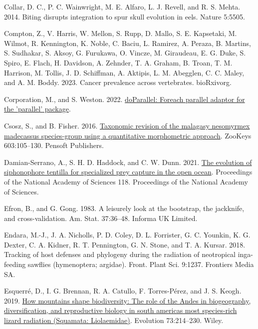 \documentclass[fleqn,10pt,lineno]{wlpeerj} %
\newlength{\cslhangindent}
\newlength{\cslentryspacingunit} %
\newenvironment{CSLReferences}[2] %
 {%
  \setlength{\parindent}{0pt}
  \ifodd #1
  \let\oldpar\par
  \def\par{\hangindent=\cslhangindent\oldpar}
  \fi
  \setlength{\parskip}{#2\cslentryspacingunit}
 }%
 {}
\begin{document}
\begin{CSLReferences}{1}{0}
\leavevmode{}%
Collar, D. C., P. C. Wainwright, M. E. Alfaro, L. J. Revell, and R. S. Mehta. 2014. Biting disrupts integration to spur skull evolution in eels. Nature 5:5505.

\leavevmode{}%
Compton, Z., V. Harris, W. Mellon, S. Rupp, D. Mallo, S. E. Kapsetaki, M. Wilmot, R. Kennington, K. Noble, C. Baciu, L. Ramirez, A. Peraza, B. Martins, S. Sudhakar, S. Aksoy, G. Furukawa, O. Vincze, M. Giraudeau, E. G. Duke, S. Spiro, E. Flach, H. Davidson, A. Zehnder, T. A. Graham, B. Troan, T. M. Harrison, M. Tollis, J. D. Schiffman, A. Aktipis, L. M. Abegglen, C. C. Maley, and A. M. Boddy. 2023. Cancer prevalence across vertebrates. bioRxivorg.

\leavevmode{}%
Corporation, M., and S. Weston. 2022. \href{https://CRAN.R-project.org/package=doParallel}{doParallel: Foreach parallel adaptor for the 'parallel' package}.

\leavevmode{}%
Csosz, S., and B. Fisher. 2016. \href{https://doi.org/10.3897/zookeys.603.8271}{Taxonomic revision of the malagasy nesomyrmex madecassus species-group using a quantitative morphometric approach}. {ZooKeys} 603:105--130. Pensoft Publishers.

\leavevmode{}%
Damian-Serrano, A., S. H. D. Haddock, and C. W. Dunn. 2021. \href{https://doi.org/10.1073/pnas.2005063118}{The evolution of siphonophore tentilla for specialized prey capture in the open ocean}. Proceedings of the National Academy of Sciences 118. Proceedings of the National Academy of Sciences.

\leavevmode{}%
Efron, B., and G. Gong. 1983. A leisurely look at the bootstrap, the jackknife, and cross-validation. Am. Stat. 37:36--48. Informa UK Limited.

\leavevmode{}%
Endara, M.-J., J. A. Nicholls, P. D. Coley, D. L. Forrister, G. C. Younkin, K. G. Dexter, C. A. Kidner, R. T. Pennington, G. N. Stone, and T. A. Kursar. 2018. Tracking of host defenses and phylogeny during the radiation of neotropical inga-feeding sawflies (hymenoptera; argidae). Front. Plant Sci. 9:1237. Frontiers Media SA.

\leavevmode{}%
Esquerré, D., I. G. Brennan, R. A. Catullo, F. Torres-Pérez, and J. S. Keogh. 2019. \href{https://doi.org/10.1111/evo.13657}{How mountains shape biodiversity: The role of the {A}ndes in biogeography, diversification, and reproductive biology in south america{\textquotesingle}s most species-rich lizard radiation ({S}quamata: {L}iolaemidae)}. Evolution 73:214--230. Wiley.


\end{CSLReferences}
\end{document}
